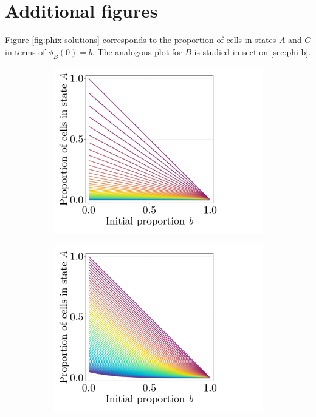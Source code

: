 \section{Additional figures}\label{sec:supp}

Figure \ref{fig:phix-solutions} corresponds to the proportion of cells in states $A$ and $C$ in terms of $\phi_B(0)=b$. The analogous plot for $B$ is studied in section \ref{sec:phi-b}.

\begin{figure}[ht]
    \centering
    \begin{subfigure}{0.4\textwidth}
        \centering
        \includegraphics[width=\textwidth]{figures/407/407-phia-vs-b-solution-constant-all.png}
    \end{subfigure}
    \hspace{5em}
    \begin{subfigure}{0.4\textwidth}
        \centering
        \includegraphics[width=\textwidth]{figures/407/407-phia-vs-b-solution-meanfield-all.png}

\end{subfigure}
\end{figure}
